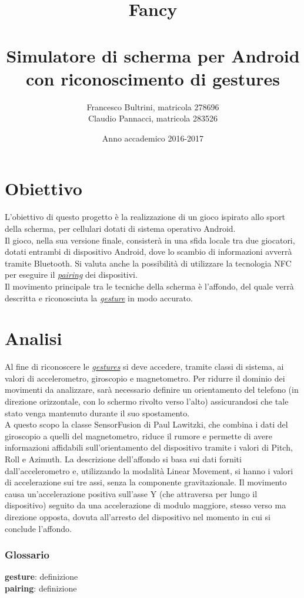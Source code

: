 \documentclass[a4paper,11pt]{article}
\title{{\Huge Fancy}\\\ \\
Simulatore di scherma per Android\\
con riconoscimento di gestures}
\author{Francesco Bultrini, matricola 278696\\
 Claudio Pannacci, matricola 283526}
\date{Anno accademico 2016-2017}
\begin{document}
\maketitle

\newpage

\tableofcontents

\newpage

\part{Obiettivo}
L'obiettivo di questo progetto è la realizzazione di un gioco  ispirato allo sport della scherma, per cellulari dotati di sistema operativo Android.\\ Il gioco, nella sua versione finale, consisterà in una sfida locale tra due giocatori, dotati entrambi di dispositivo Android, dove lo scambio di informazioni avverrà tramite Bluetooth. Si valuta anche la possibilità di utilizzare la tecnologia NFC per eseguire il \hyperref[pairing]{\emph{pairing}} dei dispositivi.\\ Il movimento principale tra le tecniche della scherma è l'affondo, del quale verrà descritta e riconosciuta la \hyperref[gesture]{\emph{gesture}} in modo accurato.
\newpage

\part{Analisi}
Al fine di riconoscere le \hyperref[gesture]{\emph{gestures}} si deve accedere, tramite classi di sistema, ai valori di accelerometro, giroscopio e magnetometro. Per ridurre il dominio dei movimenti da analizzare, sarà necessario definire un orientamento del telefono (in direzione orizzontale, con lo schermo rivolto verso l'alto) assicurandosi che tale stato venga mantenuto durante il suo spostamento.\\ A questo scopo la classe SensorFusion di Paul Lawitzki, che combina i dati del giroscopio a quelli del magnetometro, riduce il rumore e permette di avere informazioni affidabili sull'orientamento del dispositivo tramite i valori di Pitch, Roll e Azimuth. La descrizione dell'affondo si basa sui dati forniti dall'accelerometro e, utilizzando la modalità Linear Movement, si hanno i valori di accelerazione sui tre assi, senza la componente gravitazionale. Il movimento causa un'accelerazione positiva sull'asse Y (che attraversa per lungo il dispositivo) seguito da una accelerazione di modulo maggiore, stesso verso ma direzione opposta, dovuta all'arresto del dispositivo nel momento in cui si conclude l'affondo.
\newpage

\section*{Glossario}
\textbf{gesture}: definizione\\ \label{gesture}\textbf{pairing}: definizione\\ \label{pairing}
\end{document}
